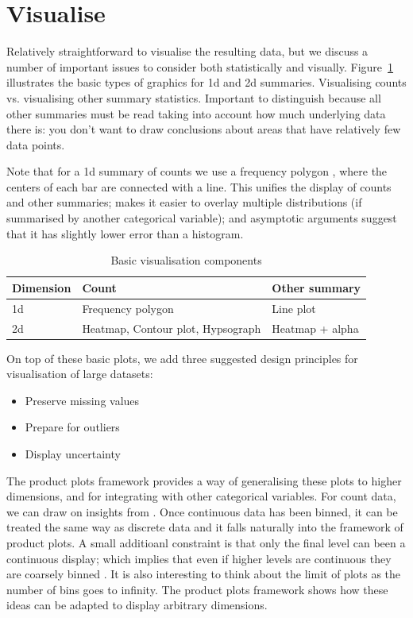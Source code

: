 \documentclass[journal]{vgtc}                %
\begin{document}

\section{Visualise}
\label{sec:visualise}

Relatively straightforward to visualise the resulting data, but we discuss a number of important issues to consider both statistically and visually.  Figure~\ref{fig:vis-types} illustrates the basic types of graphics for 1d and 2d summaries. Visualising counts vs. visualising other summary statistics.  Important to distinguish because all other summaries must be read taking into account how much underlying data there is: you don't want to draw conclusions about areas that have relatively few data points.

Note that for a 1d summary of counts we use a frequency polygon \citep{scott:1985a}, where the centers of each bar are connected with a line. This unifies the display of counts and other summaries; makes it easier to overlay multiple distributions (if summarised by another categorical variable); and asymptotic arguments suggest that it has slightly lower error than a histogram.

\begin{table}
  \scriptsize
  \centering
  \begin{tabular}{lll}
  \toprule
  Dimension & Count & Other summary\\
  \midrule
  1d & Frequency polygon & Line plot \\
  2d & Heatmap, Contour plot, Hypsograph & Heatmap + alpha\\
  \bottomrule
  \end{tabular}
  \caption{Basic visualisation components}
  \label{fig:vis-types}
\end{table}

On top of these basic plots, we add three suggested design principles for visualisation of large datasets:

\begin{itemize}
  \item Preserve missing values
  \item Prepare for outliers
  \item Display uncertainty
\end{itemize}

The product plots \citep{me:prodplots} framework provides a way of generalising these plots to higher dimensions, and for integrating with other categorical variables. For count data, we can draw on insights from . Once continuous data has been binned, it can be treated the same way as discrete data and it falls naturally into the framework of product plots. A small additioanl constraint is that only the final level can been a continuous display; which implies that even if higher levels are continuous they are coarsely binned .  It is also interesting to think about the limit of plots as the number of bins goes to infinity.  The product plots framework shows how these ideas can be adapted to display arbitrary dimensions.
\end{document}
